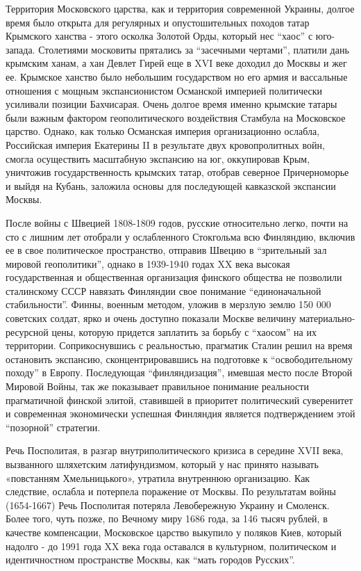 Территория Московского царства, как и территория современной Украины, долгое
время было открыта для регулярных и опустошительных походов татар Крымского
ханства - этого осколка Золотой Орды, который нес \enquote{хаос} с юго-запада.
Столетиями московиты прятались за \enquote{засечными чертами}, платили дань крымским
ханам, а хан Девлет Гирей еще в XVI веке доходил до Москвы и жег ее. Крымское
ханство было небольшим государством но его армия и вассальные отношения с
мощным экспансионистом Османской империей политически усиливали позиции
Бахчисарая. Очень долгое время именно крымские татары были важным фактором
геополитического воздействия Стамбула на Московское царство. Однако, как только
Османская империя организационно ослабла, Российская империя Екатерины II в
результате двух кровопролитных войн, смогла осуществить масштабную экспансию на
юг, оккупировав Крым, уничтожив государственность крымских татар, отобрав
северное Причерноморье и выйдя на Кубань, заложила основы для последующей
кавказской экспансии Москвы.

После войны с Швецией 1808-1809 годов, русские относительно легко, почти на сто
с лишним лет отобрали у ослабленного Стокгольма всю Финляндию, включив ее в
свое политическое пространство, отправив Швецию в \enquote{зрительный зал мировой
геополитики}, однако в 1939-1940 годах XX века высокая государственная и
общественная организация финского общества не позволили сталинскому СССР
навязать Финляндии свое понимание \enquote{единоначальной стабильности}. Финны, военным
методом, уложив в мерзлую землю 150 000 советских солдат, ярко и очень доступно
показали Москве величину материально-ресурсной цены, которую придется заплатить
за борьбу с \enquote{хаосом} на их территории. Соприкоснувшись с реальностью, прагматик
Сталин решил на время остановить экспансию, сконцентрировавшись на подготовке к
\enquote{освободительному походу} в Европу. Последующая \enquote{финляндизация}, имевшая место
после Второй Мировой Войны, так же показывает правильное понимание реальности
прагматичной финской элитой, ставившей в приоритет политический суверенитет и
современная экономически успешная Финляндия является подтверждением этой
\enquote{позорной} стратегии.

Речь Посполитая, в разгар внутриполитического кризиса в середине XVII века,
вызванного шляхетским латифундизмом, который у нас принято называть «повстанням
Хмельницького», утратила внутреннюю организацию. Как следствие, ослабла и
потерпела поражение от Москвы. По результатам войны (1654-1667) Речь Посполитая
потеряла Левобережную Украину и Смоленск. Более того, чуть позже, по Вечному
миру 1686 года, за 146 тысяч рублей, в качестве компенсации, Московское царство
выкупило у поляков Киев, который надолго - до 1991 года XX века года оставался
в культурном, политическом и идентичностном пространстве Москвы, как \enquote{мать
городов Русских}.

